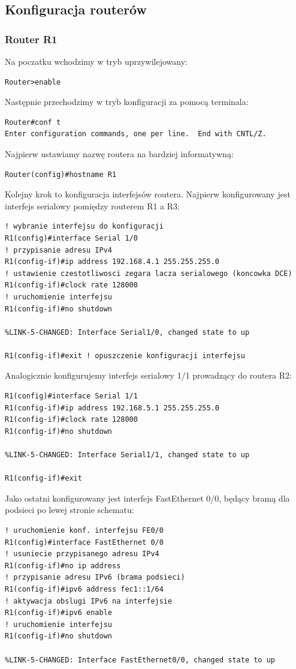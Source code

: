 \documentclass[polish,11pt,a4paper,twoside]{article}
\begin{document}
\subsection{Konfiguracja routerów}

\subsubsection{Router R1}

Na poczatku wchodzimy w tryb uprzywilejowany:
\begin{lstlisting}
Router>enable
\end{lstlisting}
Następnie przechodzimy w tryb konfiguracji za pomocą terminala:
\begin{lstlisting}
Router#conf t
Enter configuration commands, one per line.  End with CNTL/Z.
\end{lstlisting}
Najpierw ustawiamy nazwę routera na bardziej informatywną:
\begin{lstlisting}
Router(config)#hostname R1
\end{lstlisting}
Kolejny krok to konfiguracja interfejsów routera. Najpierw konfigurowany jest interfejs serialowy pomiędzy routerem R1 a R3:
\begin{lstlisting}
! wybranie interfejsu do konfiguracji
R1(config)#interface Serial 1/0 
! przypisanie adresu IPv4
R1(config-if)#ip address 192.168.4.1 255.255.255.0 
! ustawienie czestotliwosci zegara lacza serialowego (koncowka DCE)
R1(config-if)#clock rate 128000 
! uruchomienie interfejsu
R1(config-if)#no shutdown 

%LINK-5-CHANGED: Interface Serial1/0, changed state to up

R1(config-if)#exit ! opuszczenie konfiguracji interfejsu
\end{lstlisting}
Analogicznie konfigurujemy interfejs serialowy 1/1 prowadzący do routera R2:
\begin{lstlisting}
R1(config)#interface Serial 1/1
R1(config-if)#ip address 192.168.5.1 255.255.255.0
R1(config-if)#clock rate 128000
R1(config-if)#no shutdown 

%LINK-5-CHANGED: Interface Serial1/1, changed state to up

R1(config-if)#exit
\end{lstlisting}
Jako ostatni konfigurowany jest interfejs FastEthernet 0/0, będący bramą dla podsieci po lewej stronie schematu:
\begin{lstlisting}
! uruchomienie konf. interfejsu FE0/0
R1(config)#interface FastEthernet 0/0
! usuniecie przypisanego adresu IPv4 
R1(config-if)#no ip address 
! przypisanie adresu IPv6 (brama podsieci)
R1(config-if)#ipv6 address fec1::1/64 
! aktywacja obslugi IPv6 na interfejsie
R1(config-if)#ipv6 enable 
! uruchomienie interfejsu
R1(config-if)#no shutdown 

%LINK-5-CHANGED: Interface FastEthernet0/0, changed state to up
\end{lstlisting}
\end{document}
